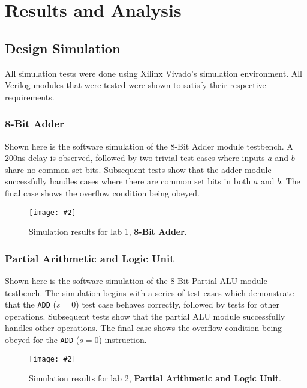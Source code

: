 \documentclass[12pt, letterpaper]{article}
\newcommand{\InsertImage}[3][\linewidth]{
	\begin{figure}[h]
		\centering
		\texttt{[image: \#2]}
		\caption{#3}
	\end{figure}
}
\newcommand{\InsertImageHere}[3][\linewidth]{
	\FloatBarrier
	\InsertImage[#1]{#2}{#3}
	\FloatBarrier
}
\begin{document}
\section{Results and Analysis}



\subsection{Design Simulation}
All simulation tests were done using Xilinx Vivado's simulation environment.  All Verilog modules that were tested were shown to satisfy their respective requirements.
\subsubsection{8-Bit Adder}
Shown here is the software simulation of the 8-Bit Adder module testbench.  A 200ns delay is observed, followed by two trivial test cases where inputs $a$ and $b$ share no common set bits.  Subsequent tests show that the adder module successfully handles cases where there are common set bits in both $a$ and $b$.  The final case shows the overflow condition being obeyed.

\InsertImageHere{images/simulations/lab1/simulation.png}{Simulation results for lab 1, \textbf{8-Bit Adder}.}

\subsubsection{Partial Arithmetic and Logic Unit}
Shown here is the software simulation of the 8-Bit Partial ALU module testbench.  The simulation begins with a series of test cases which demonstrate that the \texttt{ADD} ($s = 0$) test case behaves correctly, followed by tests for other operations.  Subsequent tests show that the partial ALU module successfully handles other operations.  The final case shows the overflow condition being obeyed for the \texttt{ADD} ($s = 0$) instruction.

\InsertImageHere{images/simulations/lab2/simulation.png}{Simulation results for lab 2, \textbf{Partial Arithmetic and Logic Unit}.}

\end{document}
